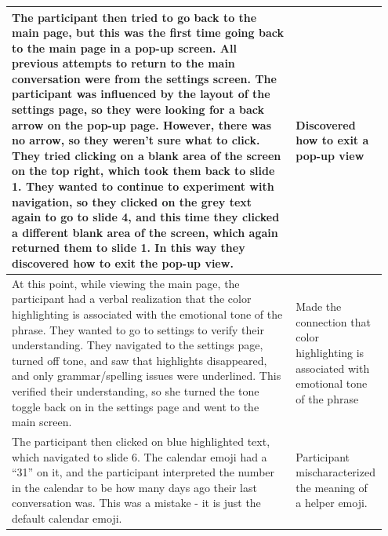 \documentclass[acmsmall,screen,authorversion,nonacm]{acmart}
\begin{document}
\begin{center}
\begin{longtable}{|p{0.75\linewidth}|p{0.2\linewidth}|}
    The participant then tried to go back to the main page, but this was the first time going back to the main page in a pop-up screen. All previous attempts to return to the main conversation were from the settings screen. The participant was influenced by the layout of the settings page, so they were looking for a back arrow on the pop-up page. However, there was no arrow, so they weren’t sure what to click. They tried clicking on a blank area of the screen on the top right, which took them back to slide 1. They wanted to continue to experiment with navigation, so they clicked on the grey text again to go to slide 4, and this time they clicked a different blank area of the screen, which again returned them to slide 1. In this way they discovered how to exit the pop-up view. & Discovered how to exit a pop-up view \\ \hline
    At this point, while viewing the main page, the participant had a verbal realization that the color highlighting is associated with the emotional tone of the phrase. They wanted to go to settings to verify their understanding. They navigated to the settings page, turned off tone, and saw that highlights disappeared, and only grammar/spelling issues were underlined. This verified their understanding, so she turned the tone toggle back on in the settings page and went to the main screen. & Made the connection that color highlighting is associated with emotional tone of the phrase \\ \hline
    The participant then clicked on blue highlighted text, which navigated to slide 6. The calendar emoji had a “31” on it, and the participant interpreted the number in the calendar to be how many days ago their last conversation was. This was a mistake - it is just the default calendar emoji. & Participant mischaracterized the meaning of a helper emoji. \\
    \end{longtable}
\end{center}
\end{document}
